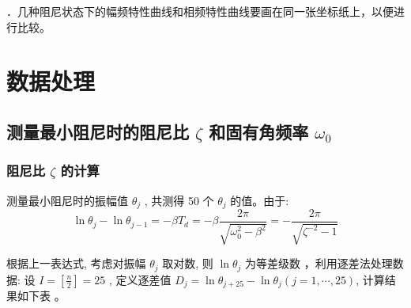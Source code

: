 \documentclass[UTF8]{ctexart}
\begin{document}
    ．几种阻尼状态下的幅频特性曲线和相频特性曲线要画在同一张坐标纸上，以便进行比较。




\section{数据处理}

\subsection{测量最小阻尼时的阻尼比  $\zeta$  和固有角频率  $\omega_{0}$}

\subsubsection{阻尼比 $ \zeta$  的计算}

测量最小阻尼时的振幅值 $ \theta_{j}$ , 共测得 50 个  $\theta_{j}$  的值。由于:
$$
\ln \theta_{j}-\ln \theta_{j-1}=-\beta T_{d}=-\beta \frac{2 \pi}{\sqrt{\omega_{0}^{2}-\beta^{2}}}=-\frac{2 \pi}{\sqrt{\zeta^{-2}-1}}
$$

根据上一表达式, 考虑对振幅 $ \theta_{j} $ 取对数, 则  $\ln \theta_{j}$  为等差级数 ，利用逐差法处理数据:
设  $I=\left[\frac{n}{2}\right]=25$ , 定义逐差值  $D_{j}=\ln \theta_{j+25}-\ln \theta_{j}(j=1, \cdots, 25) $, 计算结果如下表 。
\end{document}
